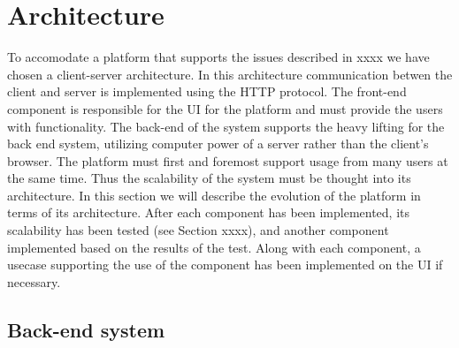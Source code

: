 \section{Architecture}
To accomodate a platform that supports the issues described in xxxx we have chosen a client-server architecture. 
In this architecture communication betwen the client and server is implemented using the HTTP protocol. 
The front-end component is responsible for the UI for the platform and must provide the users with functionality.
The back-end of the system supports the heavy lifting for the back end system, utilizing computer power of a server rather than the client's browser. 
The platform must first and foremost support usage from many users at the same time. 
Thus the scalability of the system must be thought into its architecture.
In this section we will describe the evolution of the platform in terms of its architecture.
After each component has been implemented, its scalability has been tested (see Section xxxx), and another component implemented based on the results of the test.
Along with each component, a usecase supporting the use of the component has been implemented on the UI if necessary. 



\subsection{Back-end system}


